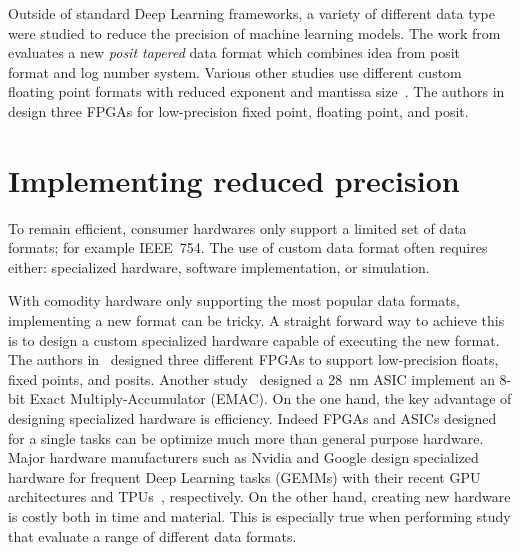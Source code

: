 Outside of standard Deep Learning frameworks, a variety of different data type were
studied to reduce the precision of machine learning models.
The work from~\cite{Johnson2018-up} evaluates a new \textit{posit tapered} data 
format which combines idea from posit~\cite{Gustafson2017-wo} format and log number system.
Various other studies use different custom floating point formats with reduced 
exponent and mantissa size~\cite{Lesser2011-mn, Chen2018-an, Vicuna2021-mw, Wang2018-oo}.
The authors in~\cite{Carmichael2019-nu} design three FPGAs for low-precision fixed
point, floating point, and posit.

\section{Implementing reduced precision}
To remain efficient, consumer hardwares only support a limited set of data formats; for example IEEE~754.
The use of custom data format often requires either: specialized hardware, software implementation, or simulation.

With comodity hardware only supporting the most popular data formats, implementing a new format can be tricky.
A straight forward way to achieve this is to design a custom specialized hardware capable of executing the new format.
The authors in~\cite{Carmichael2019-nu} designed three different FPGAs to support low-precision floats, fixed points, and posits.
Another study~\cite{Johnson2018-up} designed a \SI{28}{\nano\meter} ASIC implement an 8-bit Exact Multiply-Accumulator (EMAC).
On the one hand, the key advantage of designing specialized hardware is efficiency.
Indeed FPGAs and ASICs designed for a single tasks can be optimize much more than general purpose hardware.
Major hardware manufacturers such as Nvidia and Google design specialized hardware
for frequent Deep Learning tasks (GEMMs) with their recent GPU architectures and TPUs~\cite{tpu}, respectively.
On the other hand, creating new hardware is costly both in time and material.
This is especially true when performing study that evaluate a range of different data formats.

